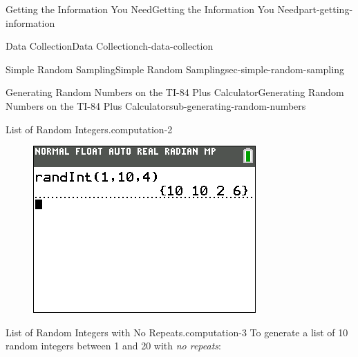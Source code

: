 \documentclass[oneside,10pt,]{book}
\newcommand{\mono}[1]{\texttt{#1}}
\numberwithin{equation}{section}
\newenvironment{codedisplay}
{\VerbatimEnvironment\begin{center}\begin{lrbox}{\codedisplaybox}\begin{BVerbatim}}
{\end{BVerbatim}\end{lrbox}\usebox{\codedisplaybox}\end{center}}
\begin{document}
\begin{partptx}{Getting the Information You Need}{}{Getting the Information You Need}{}{}{part-getting-information}
\begin{chapterptx}{Data Collection}{}{Data Collection}{}{}{ch-data-collection}
\begin{sectionptx}{Simple Random Sampling}{}{Simple Random Sampling}{}{}{sec-simple-random-sampling}
\begin{subsectionptx}{Generating Random Numbers on the TI-84 Plus Calculator}{}{Generating Random Numbers on the TI-84 Plus Calculator}{}{}{sub-generating-random-numbers}
\begin{computation}{List of Random Integers.}{computation-2}
%
\begin{figure}\centering\includegraphics[width=0.4\linewidth]{images/randInt-list.png}
\end{figure}\end{computation}
\begin{computation}{List of Random Integers with No Repeats.}{computation-3}%
\hypertarget{p-12}{}%
To generate a list of 10 random integers between 1 and 20 with \emph{no repeats}:\leavevmode%
\end{computation}
\end{subsectionptx}
\end{sectionptx}
\end{chapterptx}
\end{partptx}
\end{document}
